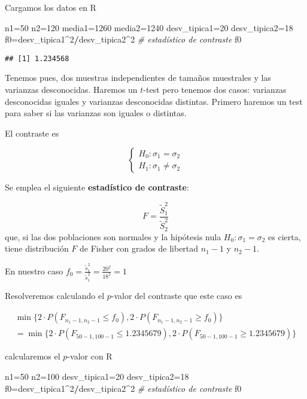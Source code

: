 \documentclass[
]{article}
\newenvironment{Shaded}{\begin{snugshade}}{\end{snugshade}}
\newcommand{\CommentTok}[1]{\textcolor[rgb]{0.56,0.35,0.01}{\textit{#1}}}
\newcommand{\DecValTok}[1]{\textcolor[rgb]{0.00,0.00,0.81}{#1}}
\newcommand{\NormalTok}[1]{#1}
\newcommand{\OperatorTok}[1]{\textcolor[rgb]{0.81,0.36,0.00}{\textbf{#1}}}
\begin{document}
Cargamos los datos en R

\begin{Shaded}
\begin{Highlighting}[]
\NormalTok{n1=}\DecValTok{50}
\NormalTok{n2=}\DecValTok{120}
\NormalTok{media1=}\DecValTok{1260}
\NormalTok{media2=}\DecValTok{1240}
\NormalTok{desv\_tipica1=}\DecValTok{20}
\NormalTok{desv\_tipica2=}\DecValTok{18}
\NormalTok{f0=desv\_tipica1}\OperatorTok{\^{}}\DecValTok{2}\OperatorTok{/}\NormalTok{desv\_tipica2}\OperatorTok{\^{}}\DecValTok{2} \CommentTok{\# estadístico de contraste}
\NormalTok{f0}
\end{Highlighting}
\end{Shaded}

\begin{verbatim}
## [1] 1.234568
\end{verbatim}

Tenemos pues, dos muestras independientes de tamaños muestrales y las
varianzas desconocidas. Haremos un \(t\)-test pero tenemos dos casos:
varianzas desconocidas iguales y varianzas desconocidas distintas.
Primero haremos un test para saber si las varianzas son iguales o
distintas.

El contraste es

\[
\left\{
\begin{array}{ll}
H_{0}:\sigma_1=\sigma_2\\
H_{1}:\sigma_1\not= \sigma_2 
\end{array}
\right.
\]

Se emplea el siguiente \textbf{estadístico de contraste}:

\[
F=\frac{\widetilde{S}_1^2}{\widetilde{S}_2^2}
\] que, si las dos poblaciones son normales y la hipótesis nula
\(H_0:\sigma_1=\sigma_2\) es cierta, tiene distribución \(F\) de Fisher
con grados de libertad \(n_1-1\) y \(n_2-1\).

En nuestro caso
\(f_0=\frac{\tilde{s}_1^2}{\tilde{s}_1^2}= \frac{20^2}{18^2}=1\)

Resolveremos calculando el \(p\)-valor del contraste que este caso es

\[
\begin{array}{l}
\min\{2\cdot P(F_{n_1-1,n_2-1}\leq f_0),2\cdot P(F_{n_1-1,n_2-1}\geq f_0)\}\\=\min\{2\cdot P(F_{50-1,100-1}\leq 1.2345679),2\cdot P(F_{50-1,100-1}\geq 1.2345679)\}
\end{array}
\]

calcularemos el \(p\)-valor con R

\begin{Shaded}
\begin{Highlighting}[]
\NormalTok{n1=}\DecValTok{50}
\NormalTok{n2=}\DecValTok{100}
\NormalTok{desv\_tipica1=}\DecValTok{20}
\NormalTok{desv\_tipica2=}\DecValTok{18}
\NormalTok{f0=desv\_tipica1}\OperatorTok{\^{}}\DecValTok{2}\OperatorTok{/}\NormalTok{desv\_tipica2}\OperatorTok{\^{}}\DecValTok{2} \CommentTok{\# estadístico de contraste}
\NormalTok{f0}
\end{Highlighting}
\end{Shaded}
\end{document}
